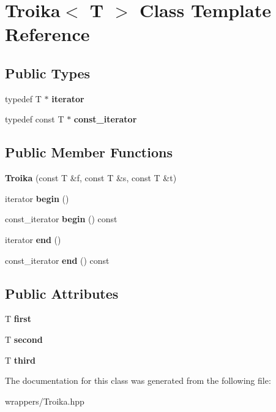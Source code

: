 \hypertarget{class_troika}{}\section{Troika$<$ T $>$ Class Template Reference}
\label{class_troika}
\subsection*{Public Types}
\begin{DoxyCompactItemize}
\item 
\mbox{\label{class_troika_a11d27be5e35b797cf73e59dc57ca2c04}} 
typedef T $\ast$ {\bfseries iterator}
\item 
\mbox{\label{class_troika_a8b23434e37f10b447f4b789f44b2712b}} 
typedef const T $\ast$ {\bfseries const\+\_\+iterator}
\end{DoxyCompactItemize}
\subsection*{Public Member Functions}
\begin{DoxyCompactItemize}
\item 
\mbox{\label{class_troika_a63881eab27cd815664a6f410c546e7ad}} 
{\bfseries Troika} (const T \&f, const T \&s, const T \&t)
\item 
\mbox{\label{class_troika_acc44fcf73b4dd7037b91cd57f0cde3af}} 
iterator {\bfseries begin} ()
\item 
\mbox{\label{class_troika_a9803405abca4d97561a5c50b3442a6e5}} 
const\+\_\+iterator {\bfseries begin} () const
\item 
\mbox{\label{class_troika_a3066101910bec9fed36fe2b01788355a}} 
iterator {\bfseries end} ()
\item 
\mbox{\label{class_troika_a8df0f548dedf48154678d3b99f60718d}} 
const\+\_\+iterator {\bfseries end} () const
\end{DoxyCompactItemize}
\subsection*{Public Attributes}
\begin{DoxyCompactItemize}
\item 
\mbox{\label{class_troika_a92b52b10d12158e936fa8497d8b448f4}} 
T {\bfseries first}
\item 
\mbox{\label{class_troika_aa9848355f83c58a89665254b8d107bb8}} 
T {\bfseries second}
\item 
\mbox{\label{class_troika_ae6e678d0e3326789a60f8dbc9fb0babe}} 
T {\bfseries third}
\end{DoxyCompactItemize}


The documentation for this class was generated from the following file\+:\begin{DoxyCompactItemize}
\item 
wrappers/Troika.\+hpp\end{DoxyCompactItemize}
